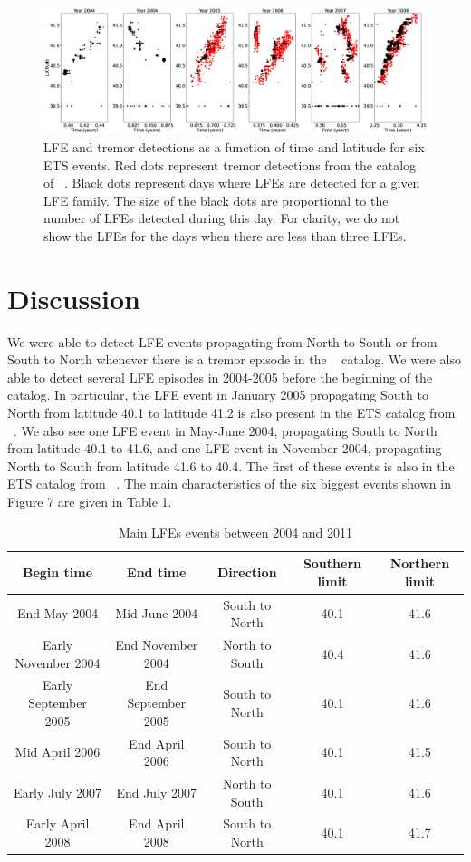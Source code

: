 \documentclass[draft]{agujournal2019}
\begin{document}
\begin{figure}
\noindent\includegraphics[width=\textwidth, trim={0cm 0cm 0cm 0cm},clip]{figures/zoom_ETS_events.eps}
\caption{LFE and tremor detections as a function of time and latitude for six ETS events. Red dots represent tremor detections from the catalog of ~. Black dots represent days where LFEs are detected for a given LFE family. The size of the black dots are proportional to the number of LFEs detected during this day. For clarity, we do not show the LFEs for the days when there are less than three LFEs.}
\label{pngfiguresample}
\end{figure}

\section{Discussion}

We were able to detect LFE events propagating from North to South or from South to North whenever there is a tremor episode in the ~ catalog. We were also able to detect several LFE episodes in 2004-2005 before the beginning of the ~ catalog. In particular, the LFE event in January 2005 propagating South to North from latitude 40.1 to latitude 41.2 is also present in the ETS catalog from ~. We also see one LFE event in May-June 2004, propagating South to North from latitude 40.1 to 41.6, and one LFE event in November 2004, propagating North to South from latitude 41.6 to 40.4. The first of these events is also in the ETS catalog from ~. The main characteristics of the six biggest events shown in Figure 7 are given in Table 1. \\

\begin{table}
\caption{Main LFEs events between 2004 and 2011}
\centering
\begin{tabular}{c c c c c}
\hline
Begin time & End time & Direction & Southern limit & Northern limit \\
\hline
End May 2004 & Mid June 2004 & South to North & 40.1 & 41.6 \\
Early November 2004 & End November 2004 & North to South & 40.4 & 41.6 \\
Early September 2005 & End September 2005 & South to North & 40.1 & 41.6 \\
Mid April 2006 & End April 2006 & South to North & 40.1 & 41.5 \\
Early July 2007 & End July 2007 & North to South & 40.1 & 41.6 \\
Early April 2008 & End April 2008 & South to North & 40.1 & 41.7 \\
\hline
\end{tabular}
\end{table}
\end{document}
